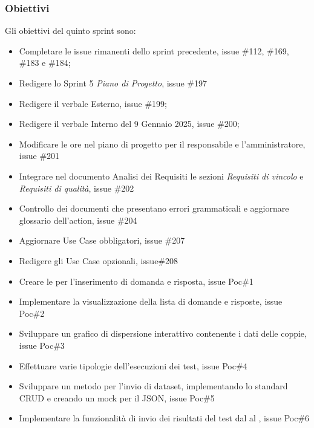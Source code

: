 \subsubsection{Obiettivi}
Gli obiettivi del quinto sprint sono:
\begin{itemize}
    \item Completare le issue rimanenti dello sprint precedente, issue \#112, \#169, \#183 e \#184;
    \item Redigere lo Sprint 5 \textit{Piano di Progetto}, issue \#197
    \item Redigere il verbale Esterno, issue \#199;
    \item Redigere il verbale Interno del 9 Gennaio 2025, issue \#200;
    \item Modificare le ore nel piano di progetto per il responsabile e l’amministratore, issue \#201
    \item Integrare nel documento Analisi dei Requisiti le sezioni \textit{Requisiti di vincolo} e \textit{Requisiti di qualità}, issue \#202
    \item Controllo dei documenti che presentano errori grammaticali e aggiornare glossario dell'action, issue \#204
    \item Aggiornare Use Case obbligatori, issue \#207
    \item Redigere gli Use Case opzionali, issue\#208
    \item Creare le  per l'inserimento di domanda e risposta, issue Poc\#1
    \item Implementare la visualizzazione della lista di domande e risposte, issue Poc\#2
    \item Sviluppare un grafico di dispersione interattivo contenente i dati delle coppie, issue Poc\#3
    \item Effettuare varie tipologie dell'esecuzioni dei test, issue Poc\#4
    \item Sviluppare un metodo per l’invio di dataset, implementando lo standard CRUD e creando un mock per il JSON, issue Poc\#5
    \item Implementare la funzionalità di invio dei risultati del test dal  al , issue Poc\#6
\end{itemize}